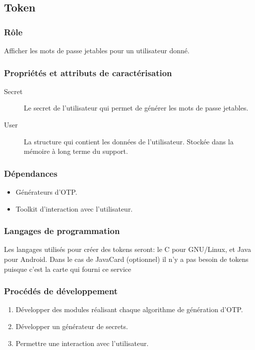 \documentclass{"../../res/univ-projet"}
\begin{document}
\subsection{Token}
    \subsubsection{Rôle}
        Afficher les mots de passe jetables pour un utilisateur donné.

    \subsubsection{Propriétés et attributs de caractérisation}
    \begin{description}
        \item[Secret] Le secret de l'utilisateur qui permet de générer les
            mots de passe jetables.
        \item[User] La structure qui contient les données de l'utilisateur.
            Stockée dans la mémoire à long terme du support.
    \end{description}

    \subsubsection{Dépendances}
        \begin{itemize}
            \item Générateurs d'OTP.
            \item Toolkit d'interaction avec l'utilisateur.
        \end{itemize}

    \subsubsection{Langages de programmation}
        Les langages utilisés pour créer des tokens seront: le C pour GNU/Linux,
    et Java pour Android. Dans le cas de JavaCard (optionnel) il n'y a pas besoin
    de tokens puisque c'est la carte qui fourni ce service

    \subsubsection{Procédés de développement}
    \begin{enumerate}
        \item Développer des modules réalisant chaque algorithme de génération
            d'OTP.
        \item Développer un générateur de secrets.
        \item Permettre une interaction avec l'utilisateur.
    \end{enumerate}
\end{document}
